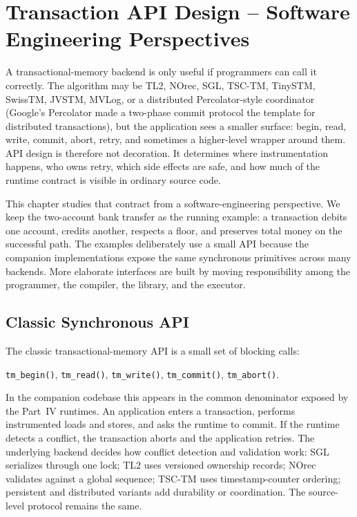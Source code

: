 \chapter[Transaction API Design]{Transaction API Design – Software Engineering Perspectives}

A transactional-memory backend is only useful if programmers can call it correctly. The algorithm may be TL2, NOrec, SGL, TSC-TM, TinySTM, SwissTM, JVSTM, MVLog, or a distributed Percolator-style coordinator (Google's Percolator made a
two-phase commit protocol the template for distributed transactions), but the
application sees a smaller surface: begin, read, write, commit, abort, retry, and sometimes a higher-level wrapper around them. API design is therefore not decoration. It determines where instrumentation happens, who owns retry, which side effects are safe, and how much of the runtime contract is visible in ordinary source code.

This chapter studies that contract from a software-engineering perspective. We keep the two-account bank transfer as the running example: a transaction debits one account, credits another, respects a floor, and preserves total money on the successful path. The examples deliberately use a small API because the companion implementations expose the same synchronous primitives across many backends. More elaborate interfaces are built by moving responsibility among the programmer, the compiler, the library, and the executor.

\section{Classic Synchronous API}

The classic transactional-memory API is a small set of blocking calls:

\begin{center}
\texttt{tm\_begin()}, \texttt{tm\_read()}, \texttt{tm\_write()}, \texttt{tm\_commit()}, \texttt{tm\_abort()}.
\end{center}

In the companion codebase this appears in the common denominator exposed by the Part~IV runtimes. An application enters a transaction, performs instrumented loads and stores, and asks the runtime to commit. If the runtime detects a conflict, the transaction aborts and the application retries. The underlying backend decides how conflict detection and validation work: SGL serializes through one lock; TL2 uses versioned ownership records; NOrec validates against a global sequence; TSC-TM uses timestamp-counter ordering; persistent and distributed variants add durability or coordination. The source-level protocol remains the same.

